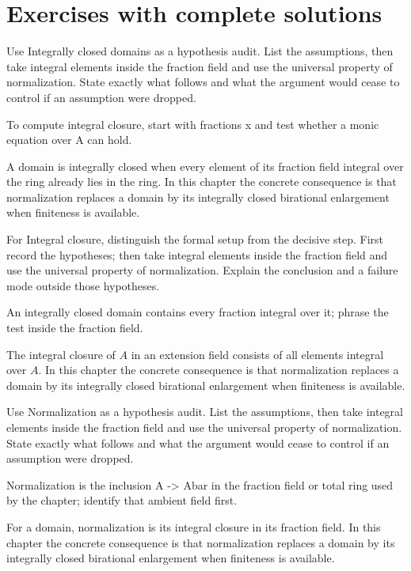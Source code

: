 \section{Exercises with complete solutions}

\begin{exercise}\label{exr:v20-01}
Use Integrally closed domains as a hypothesis audit. List the assumptions, then take integral elements inside the fraction field and use the universal property of normalization. State exactly what follows and what the argument would cease to control if an assumption were dropped.
\end{exercise}
\begin{hint}
To compute integral closure, start with fractions x and test whether a monic equation over A can hold.
\end{hint}
\begin{solution}
A domain is integrally closed when every element of its fraction field integral over the ring already lies in the ring. In this chapter the concrete consequence is that normalization replaces a domain by its integrally closed birational enlargement when finiteness is available.
\end{solution}

\begin{exercise}\label{exr:v20-02}
For Integral closure, distinguish the formal setup from the decisive step. First record the hypotheses; then take integral elements inside the fraction field and use the universal property of normalization. Explain the conclusion and a failure mode outside those hypotheses.
\end{exercise}
\begin{hint}
An integrally closed domain contains every fraction integral over it; phrase the test inside the fraction field.
\end{hint}
\begin{solution}
The integral closure of $A$ in an extension field consists of all elements integral over $A$. In this chapter the concrete consequence is that normalization replaces a domain by its integrally closed birational enlargement when finiteness is available.
\end{solution}

\begin{exercise}\label{exr:v20-03}
Use Normalization as a hypothesis audit. List the assumptions, then take integral elements inside the fraction field and use the universal property of normalization. State exactly what follows and what the argument would cease to control if an assumption were dropped.
\end{exercise}
\begin{hint}
Normalization is the inclusion A -> Abar in the fraction field or total ring used by the chapter; identify that ambient field first.
\end{hint}
\begin{solution}
For a domain, normalization is its integral closure in its fraction field. In this chapter the concrete consequence is that normalization replaces a domain by its integrally closed birational enlargement when finiteness is available.
\end{solution}

